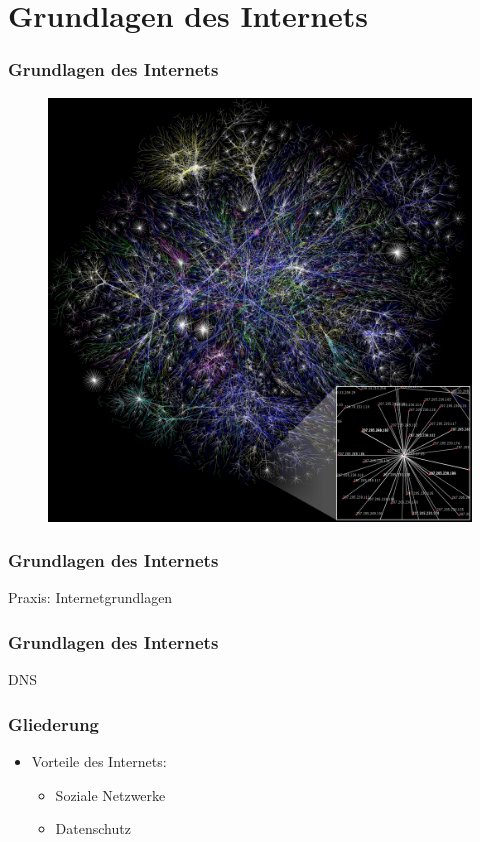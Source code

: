 \documentclass[12pt]{beamer}
\begin{document}
\section{Grundlagen des Internets}

\begin{frame}
  \frametitle{Grundlagen des Internets}
  \begin{figure}
    \includegraphics[height=0.7\textheight]{img/internet_map.jpg}
  \end{figure}
\end{frame}

\begin{frame}
  \frametitle{Grundlagen des Internets}
  \begin{center} \Large
    Praxis: Internetgrundlagen
  \end{center}
\end{frame}

\begin{frame}
  \frametitle{Grundlagen des Internets}
  \begin{center} \Large
  DNS
  \end{center}
\end{frame}

\begin{frame}
  \frametitle{Gliederung}
  \begin{itemize}
    \item Vorteile des Internets:
      \begin{itemize}
        \item Soziale Netzwerke
        \item Datenschutz
      \end{itemize}
  \end{itemize}
\end{frame}
\end{document}
